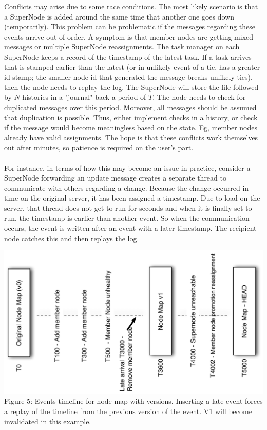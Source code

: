 \documentclass[oneside,12pt]{memoir}
\begin{document}
Conflicts may arise due to some race conditions.  The most likely scenario is that a SuperNode is added around the same time that another one goes down (temporarily).    This problem can be problematic if the messages regarding these events arrive out of order.  A symptom is that member nodes are getting mixed messages or multiple SuperNode reassignments.  
  The task manager on each SuperNode keeps a record of the timestamp of the latest task.  If a task arrives that is stamped earlier than the latest (or in unlikely event of a tie, has a greater id stamp; the smaller node id that generated the message breaks unlikely ties), then the node needs to replay the log. 
  The SuperNode will store the file followed by $N$ histories in a "journal" back a period of $T$.  
    The node needs to check for duplicated messages over this period.  Moreover, all messages should be assumed that duplication is possible.  Thus, either implement checks in a history, or check if the message would become meaningless based on the state.  Eg, member nodes already have valid assignments.   The hope is that these conflicts work themselves out after minutes, so patience is required on the user's part. \\
    \\
   For instance, in terms of how this may become an issue in practice, consider a SuperNode forwarding an update message creates a separate thread to communicate with others regarding a change.  Because the change occurred in time on the original server, it has been assigned a timestamp.  Due to load on the server, that thread does not get to run for seconds and when it is finally set to run, the timestamp is earlier than another event.  So when the communication occurs, the event is written after an event with a later timestamp.  The recipient node catches this and then replays the log.   \\
 
    
\begin{center}
\includegraphics[width=\textwidth]{presentation/timeline.pdf}
Figure 5: Events timeline for node map with versions.  Inserting a late event forces a replay of the timeline from the previous version of the event.  V1 will become invalidated in this example. 
\end{center}
\end{document}
